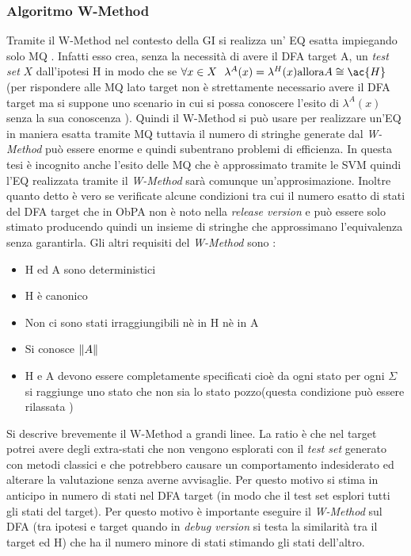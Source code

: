 \subsubsection{Algoritmo W-Method}
Tramite il W-Method nel contesto della \ac{GI} si realizza un' \ac{EQ} esatta impiegando solo \ac{MQ} \cite{Balanescu03}. Infatti esso crea, senza la necessità di avere il \ac{DFA} target A,  un \textit{test set}  $X$ dall'ipotesi \ac{H} in modo che se $\forall x \in X \:\:\: \lambda^{A}(x) = \lambda^{H}(x) \text{allora} A \cong \ac{H}$  (per rispondere alle \ac{MQ} lato target non è strettamente necessario avere il \ac{DFA} target ma si suppone uno scenario in cui si possa conoscere l'esito di $\lambda^{A}(x)$ senza la sua conoscenza ). Quindi il W-Method si può usare per realizzare un'\ac{EQ} in maniera esatta tramite \ac{MQ} tuttavia il numero di stringhe generate dal \textit{W-Method} può essere enorme e quindi subentrano problemi di efficienza. In questa tesi è incognito anche l'esito delle \ac{MQ} che è approssimato tramite le \ac{SVM} quindi l'\ac{EQ} realizzata tramite il \textit{W-Method} sarà comunque un'approsimazione. Inoltre quanto detto è vero se verificate alcune condizioni tra cui il numero esatto di stati del \ac{DFA} target   che in \ac{ObPA} non è noto nella \textit{release version} e può essere solo stimato producendo quindi un insieme di stringhe che approssimano l'equivalenza senza garantirla. Gli altri requisiti del \textit{W-Method} sono \cite{Balanescu03}:
\begin{itemize}
\item \ac{H} ed A sono deterministici
\item \ac{H} è canonico
\item Non ci sono stati irraggiungibili nè in \ac{H} nè in A
\item Si conosce $\lVert A\rVert$
\item \ac{H} e A devono essere completamente specificati cioè da ogni stato per ogni $\Sigma$ si raggiunge uno stato che non sia lo stato pozzo(questa condizione può essere rilassata \cite{Balanescu03})
\end{itemize}
Si descrive brevemente il W-Method a grandi linee.   La ratio è che nel target potrei avere degli extra-stati che non vengono esplorati con il \textit{test set} generato con metodi classici e che potrebbero causare un comportamento indesiderato ed alterare la valutazione senza averne avvisaglie. Per questo motivo si stima in anticipo in numero di stati nel \ac{DFA} target (in modo che il test set esplori tutti gli stati del target). Per questo motivo è importante eseguire il \textit{W-Method} sul \ac{DFA} (tra ipotesi e target quando in \textit{debug version} si testa la similarità tra il target ed \ac{H}) che ha il numero minore di stati stimando gli stati dell'altro.\\
